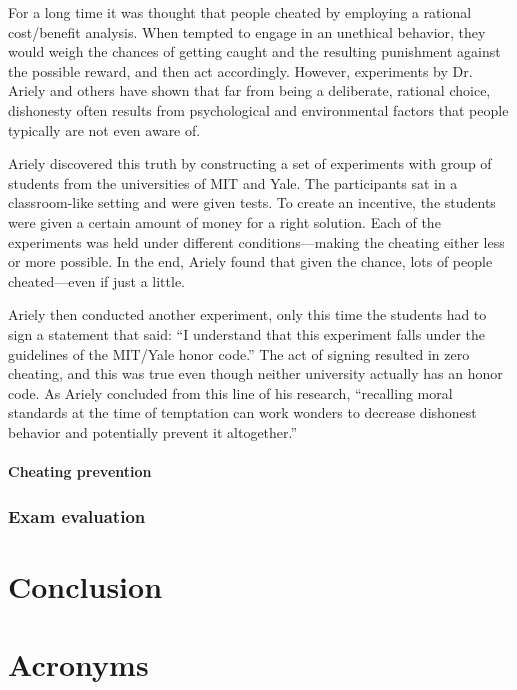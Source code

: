 \documentclass[thesis=M,english,hidelinks]{FITthesis}[2012/10/20]
\begin{document}
For a long time it was thought that people cheated by employing a rational cost/benefit analysis. When tempted to engage in an unethical behavior, they would weigh the chances of getting caught and the resulting punishment against the possible reward, and then act accordingly. However, experiments by Dr. Ariely and others have shown that far from being a deliberate, rational choice, dishonesty often results from psychological and environmental factors that people typically are not even aware of.

Ariely discovered this truth by constructing a set of experiments with group of students from the universities of MIT and Yale. The participants sat in a classroom-like setting and were given tests. To create an incentive, the students were given a certain amount of money for a right solution. Each of the experiments was held under different conditions---making the cheating either less or more possible. In the end, Ariely found that given the chance, lots of people cheated---even if just a little.

Ariely then conducted another experiment, only this time the students had to sign a statement that said: ``I understand that this experiment falls under the guidelines of the MIT/Yale honor code.'' The act of signing resulted in zero cheating, and this was true even though neither university actually has an honor code. As Ariely concluded from this line of his research, ``recalling moral standards at the time of temptation can work wonders to decrease dishonest behavior and potentially prevent it altogether.''

      \subsubsection{Cheating prevention}



    \subsection{Exam evaluation}

\chapter{Conclusion}





\appendix

\chapter{Acronyms}
\end{document}

